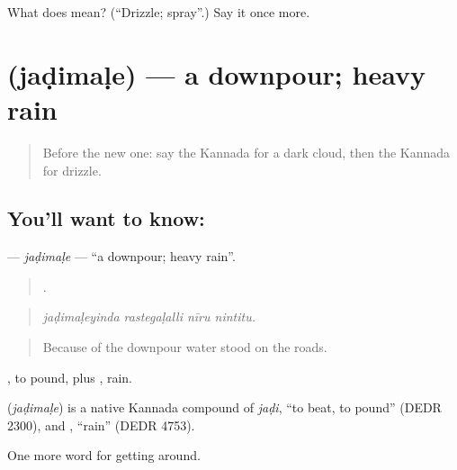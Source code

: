 \begin{tcolorbox}[breakable,colback=teal!4,colframe=teal!35!black,title={Before you move on}]
What does  mean? (\textquotedblleft{}Drizzle; spray\textquotedblright{}.) Say it once more.
\end{tcolorbox}
\section[\texorpdfstring{\kn{ಜಡಿಮಳೆ} (jaḍimaḷe)}{ಜಡಿಮಳೆ (jaḍimaḷe)}]{ (jaḍimaḷe) — a downpour; heavy rain}

\label{lesson:KA-C485-jadimale}



\begin{quote}
Before the new one: say the Kannada for a dark cloud, then the Kannada for drizzle.
\end{quote}

\subsection*{You'll want to know: }
\textbf{} — \emph{jaḍimaḷe} — \textquotedblleft{}a downpour; heavy rain\textquotedblright{}.

\begin{quote}
   .
\end{quote}

\begin{quote}
\emph{jaḍimaḷeyinda rastegaḷalli nīru nintitu.}
\end{quote}

\begin{quote}
Because of the downpour water stood on the roads.
\end{quote}

, to pound, plus , rain.

\begin{cousinweb}
\textbf{} (\emph{jaḍimaḷe}) is a native Kannada compound of \emph{jaḍi}, \textquotedblleft{}to beat, to pound\textquotedblright{} (DEDR 2300), and , \textquotedblleft{}rain\textquotedblright{} (DEDR 4753).
\end{cousinweb}

\begin{grammarlens}[title={What you've built}]
One more word for getting around.
\end{grammarlens}

